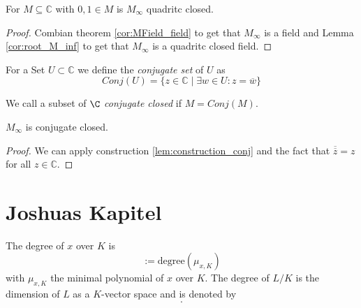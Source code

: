 \begin{lemma}
    For $M\subseteq \mathbb{C}$ with $0,1 \in M$ is $M_{\infty}$ quadritc closed.
\end{lemma}
\begin{proof}
    Combian theorem \ref{cor:MField_field} to get that $M_{\infty}$ is a field and Lemma \ref{cor:root_M_inf} to get that $M_{\infty}$ is a quadritc closed field.
\end{proof}

\begin{definition}
    For a Set $U \subset \mathbb{C}$ we define the \emph{conjugate set} of $U$ as 
    \begin{equation*}
        Conj(U) = \{z\in \mathbb{C} \mid \exists w\in U: z = \overline{w}\}
    \end{equation*}
\end{definition}

\begin{definition}
    We call a subset of $\C$ \emph{conjugate closed} if $M= Conj(M)$.
\end{definition}

\begin{lemma}
    $M_{\infty}$ is conjugate closed.
\end{lemma}
\begin{proof}
    We can apply construction \ref{lem:construction_conj} and the fact that $\overline{\overline z} = z$ for all $z \in\mathbb{C}$.
\end{proof}




\section{Joshuas Kapitel}

\begin{definition}
    The degree of $x$ over $K$ is
    \begin{equation*}
        [x:K] :=\text{degree}(\mu_{x,K})
        \end{equation*}
        with $\mu_{x,K}$ the minimal polynomial of $x$ over $K$. \newline
    The degree of $L/K$ is the dimension of $L$ as a $K$-vector space and is denoted by
    \begin{equation*}
        [L:K].
    \end{equation*}
\end{definition}

